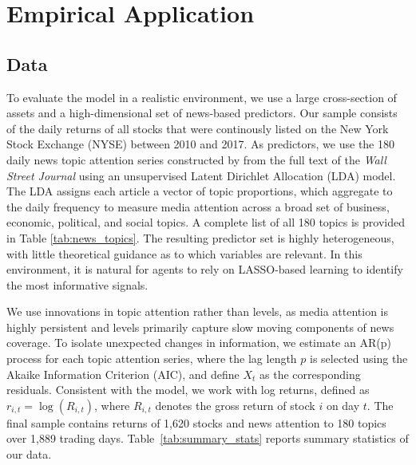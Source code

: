 \documentclass[11pt]{article}
\begin{document}
\section{Empirical Application}\label{sec:empirical}

\subsection{Data}

To evaluate the model in a realistic environment, we use a large cross-section of assets and a high-dimensional set of news-based predictors.
Our sample consists of the daily returns of all stocks that were continously listed on the New York Stock Exchange (NYSE) between 2010 and 2017.
As predictors, we use the 180 daily news topic attention series constructed by \citet{Bybee2021} from the full text of the \textit{Wall Street Journal} using an unsupervised Latent Dirichlet Allocation (LDA) model.
The LDA assigns each article a vector of topic proportions, which \citet{Bybee2021} aggregate to the daily frequency to measure media attention across a broad set of business, economic, political, and social topics.
A complete list of all 180 topics is provided in Table \ref{tab:news_topics}.
The resulting predictor set is highly heterogeneous, with little theoretical guidance as to which variables are relevant.
In this environment, it is natural for agents to rely on LASSO-based learning to identify the most informative signals.

We use innovations in topic attention rather than levels, as media attention is highly persistent and levels primarily capture slow moving components of news coverage. 
To isolate unexpected changes in information, we estimate an AR(p) process for each topic attention series, where the lag length $p$ is selected using the Akaike Information Criterion (AIC), and define $X_t$ as the corresponding residuals.
Consistent with the model, we work with log returns, defined as $r_{i,t} = \log(R_{i,t})$, where $R_{i,t}$ denotes the gross return of stock $i$ on day $t$. 
The final sample contains returns of 1{,}620 stocks and news attention to 180 topics over 1{,}889 trading days.
Table~\ref{tab:summary_stats} reports summary statistics of our data.
\end{document}

